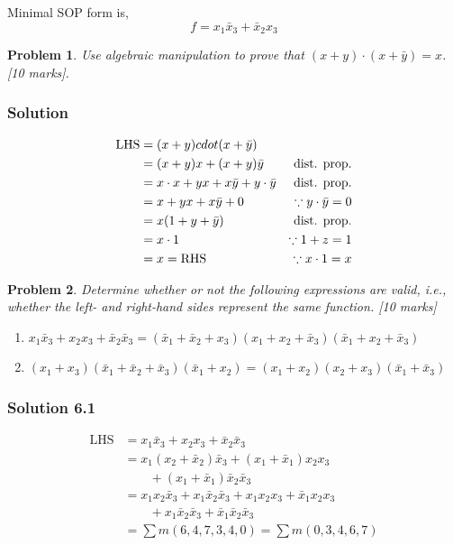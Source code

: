 \documentclass[twocolumn]{article}
\newtheorem{prob}{Problem}
\newcommand{\bx}{\bar{x}}
\newcommand{\by}{\bar{y}}
\begin{document}
Minimal SOP form is,
\[
f = x_1 \bx_3 + \bx_2 x_3
\]

\begin{prob}
Use algebraic manipulation to prove that $(x+y)\cdot(x+\bar{y}) = x$. \cite[Prob 2.2]{brown2013fundamentals} [10 marks].
\end{prob}
\subsubsection*{Solution}

\begin{align}
  \text{LHS} &= (x+y)cdot(x+\bar{y}) &
                                       \notag\\
             &= (x+y)x + (x+y)\by & \text{dist. prop.}
                                    \notag\\
             &= x \cdot x + yx + x\by + y\cdot \by & \text{dist. prop.}
                                                     \notag\\
             &= x + yx + x\by + 0 & \because y \cdot \by = 0
                                    \notag\\
             &= x(1+y +\by) & \text{dist. prop.}
                              \notag \\
             &= x\cdot 1 & \because 1 + z = 1
                           \notag \\
             &= x = \text{RHS}& \because x \cdot 1 = x
\end{align}


\begin{prob}
  Determine whether or not the following expressions are valid, i.e., whether the left- and
  right-hand sides represent the same function.
  \cite[Prob 2.7]{brown2013fundamentals}[10 marks]
  \begin{enumerate}
  \item $x_1 \bx_3 + x_2 x_3 + \bx_2 \bx_3 = (\bx_1 + \bx_2 + x_3)(x_1 + x_2 + \bx_3)(\bx_1 + x_2 + \bx_3)$
  \item $(x_1 + x_3)(\bx_1 + \bx_2 + \bx_3)(\bx_1 + x_2) = (x_1 + x_2)(x_2 + x_3)(\bx_1 + \bx_3)$
    \end{enumerate}
\end{prob}

\subsubsection*{Solution 6.1}
    \begin{align*}
      \text{LHS} &= x_1 \bx_3 + x_2 x_3 + \bx_2 \bx_3
      \\
                 &= x_1 (x_2 + \bx_2) \bx_3 + (x_1 + \bx_1)x_2 x_3
                   \\
                 &\qquad+ (x_1 + \bx_1)\bx_2 \bx_3
      \\
                 &= x_1 x_2\bx_3 + x_1\bx_2 \bx_3 + x_1x_2x_3 + \bx_1x_2 x_3 \\
      &\qquad + x_1\bx_2\bx_3 + \bx_1\bx_2 \bx_3
        \\
      &= \sum m(6, 4, 7, 3, 4, 0) = \sum m(0, 3, 4, 6, 7)
      \end{align*}
\end{document}
